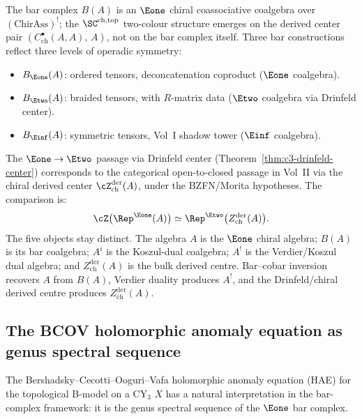 The bar complex $B(A)$ is an $\Eone$ chiral coassociative coalgebra over $(\mathrm{ChirAss})^!$; the $\SC^{\mathrm{ch,top}}$ two-colour structure emerges on the derived center pair $(C^\bullet_{\mathrm{ch}}(A,A),\, A)$, not on the bar complex itself. Three bar constructions reflect three levels of operadic symmetry:
\begin{itemize}
 \item $B_{\Eone}(A)$: ordered tensors, deconcatenation coproduct ($\Eone$ coalgebra).
 \item $B_{\Etwo}(A)$: braided tensors, with $R$-matrix data ($\Etwo$ coalgebra via Drinfeld center).
 \item $B_{\Einf}(A)$: symmetric tensors, Vol~I shadow tower ($\Einf$ coalgebra).
\end{itemize}
The $\Eone \to \Etwo$ passage via Drinfeld center
(Theorem~\ref{thm:c3-drinfeld-center}) corresponds to the categorical
open-to-closed passage in Vol~II via the chiral derived center
$\cZ^{\mathrm{der}}_{\mathrm{ch}}(A)$, under the BZFN/Morita
hypotheses. The comparison is:
\[
 \cZ\bigl(\Rep^{\Eone}(A)\bigr) \simeq \Rep^{\Etwo}\bigl(Z^{\mathrm{der}}_{\mathrm{ch}}(A)\bigr).
\]
The five objects stay distinct. The algebra $A$ is the $\Eone$ chiral
algebra; $B(A)$ is its bar coalgebra; $A^i$ is the Koszul-dual
coalgebra; $A^!$ is the Verdier/Koszul dual algebra; and
$Z^{\mathrm{der}}_{\mathrm{ch}}(A)$ is the bulk derived centre.
Bar--cobar inversion recovers $A$ from $B(A)$, Verdier duality produces
$A^!$, and the Drinfeld/chiral derived centre produces
$Z^{\mathrm{der}}_{\mathrm{ch}}(A)$.

\subsection{The BCOV holomorphic anomaly equation as genus spectral sequence}
\label{subsec:bcov-genus-spectral}

The Bershadsky--Cecotti--Ooguri--Vafa holomorphic anomaly equation (HAE) for the topological B-model on a CY$_3$ $X$ has a natural interpretation in the bar-complex framework: it is the genus spectral sequence of the $\Eone$ bar complex.

